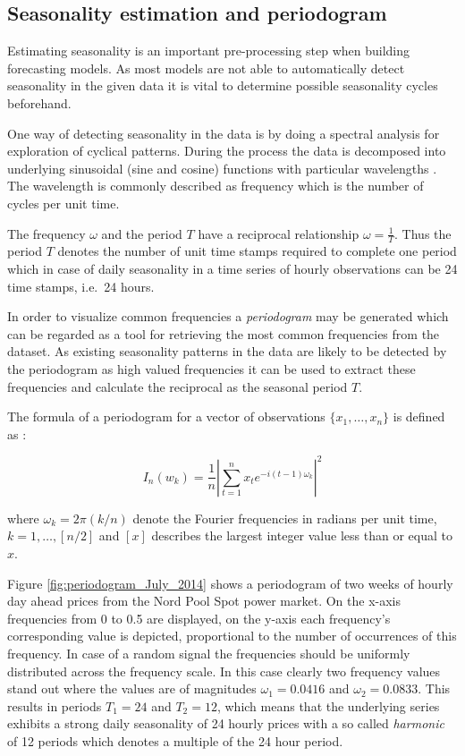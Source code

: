 \subsection{Seasonality estimation and periodogram}

Estimating seasonality is an important pre-processing step when building forecasting models. As most models are not able to automatically detect seasonality in the given data it is vital to determine possible seasonality cycles beforehand. 

One way of detecting seasonality in the data is by doing a spectral analysis for exploration of cyclical patterns. 
During the process the data is decomposed into underlying sinusoidal (sine and cosine) functions with particular wavelengths \cite{weron2007modeling}. 
The wavelength is commonly described as frequency which is the number of cycles per unit time. 

The frequency $\omega$ and the period $T$ have a reciprocal relationship $\omega = \frac{1}{T}$. Thus the period $T$ denotes the number of unit time stamps required to complete one period which in case of daily seasonality in a time series of hourly observations can be 24 time stamps, i.e.~24 hours. 

In order to visualize common frequencies a \textit{periodogram} may be generated which can be regarded as a tool for retrieving the most common frequencies from the dataset. As existing seasonality patterns in the data are likely to be detected by the periodogram as high valued frequencies it can be used to extract these frequencies and calculate the reciprocal as the seasonal period $T$. 

The formula of a periodogram for a vector of observations $\{x_1,\ldots,x_n\}$ is defined as \cite{weron2007modeling}:

		\[ I_n (w_k) = \frac{1}{n} \left| \sum_{t=1}^{n}{x_t  e^{-i(t-1) \omega_k} } \right|^2 \]
		
		where $\omega_k = 2 \pi (k/n)$ denote the Fourier frequencies in radians per unit time, $k = 1,\ldots,[n/2]$ and $[x]$ describes the largest integer value less than or equal to $x$. 

Figure \ref{fig:periodogram_July_2014} shows a periodogram of two weeks of hourly day ahead prices from the Nord Pool Spot power market. 
On the x-axis frequencies from 0 to 0.5 are displayed, on the y-axis each frequency's corresponding value is depicted, proportional to the number of occurrences of this frequency. In case of a random signal the frequencies should be uniformly distributed across the frequency scale. In this case clearly two frequency values stand out where the values are of magnitudes $\omega_1 = 0.0416$ and $\omega_2 = 0.0833$. This results in periods $T_1 = 24$ and $T_2 = 12$, which means that the underlying series exhibits a strong daily seasonality of 24 hourly prices with a so called \textit{harmonic} of 12 periods which denotes a multiple of the 24 hour period. 


